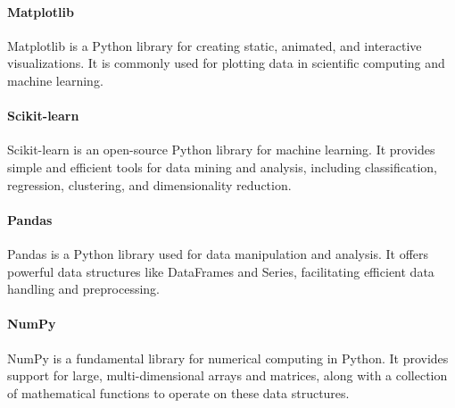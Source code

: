\paragraph{Matplotlib} Matplotlib is a Python library for creating static, animated, and interactive visualizations. It is commonly used for plotting data in scientific computing and machine learning.

\paragraph{Scikit-learn} Scikit-learn is an open-source Python library for machine learning. It provides simple and efficient tools for data mining and analysis, including classification, regression, clustering, and dimensionality reduction.

\paragraph{Pandas} Pandas is a Python library used for data manipulation and analysis. It offers powerful data structures like DataFrames and Series, facilitating efficient data handling and preprocessing.

\paragraph{NumPy} NumPy is a fundamental library for numerical computing in Python. It provides support for large, multi-dimensional arrays and matrices, along with a collection of mathematical functions to operate on these data structures.